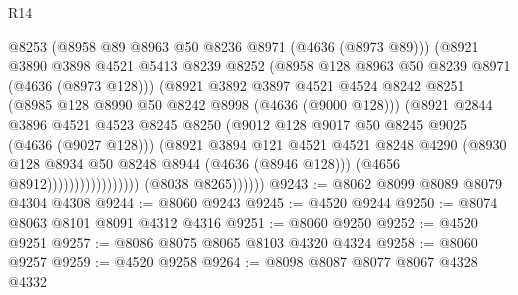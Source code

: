 \begin{lexlean}{R14}
\begin{coremodule}
                                      @8253
                                      (@8958 @89 @8963 @50 @8236 @8971 (@4636 (@8973 @89)))
                                      (@8921
                                        @3890
                                        @3898
                                        @4521
                                        @5413
                                        @8239
                                        @8252
                                        (@8958 @128 @8963 @50 @8239 @8971 (@4636 (@8973 @128)))
                                        (@8921
                                          @3892
                                          @3897
                                          @4521
                                          @4524
                                          @8242
                                          @8251
                                          (@8985 @128 @8990 @50 @8242 @8998 (@4636 (@9000 @128)))
                                          (@8921
                                            @2844
                                            @3896
                                            @4521
                                            @4523
                                            @8245
                                            @8250
                                            (@9012 @128 @9017 @50 @8245 @9025 (@4636 (@9027 @128)))
                                            (@8921
                                              @3894
                                              @121
                                              @4521
                                              @4521
                                              @8248
                                              @4290
                                              (@8930
                                                @128
                                                @8934
                                                @50
                                                @8248
                                                @8944
                                                (@4636 (@8946 @128)))
                                              (@4656 @8912)))))))))))))))))
              (@8038 @8265))))))
@9243 := @8062 @8099 @8089 @8079 @4304 @4308
@9244 := @8060 @9243
@9245 := @4520 @9244
@9250 := @8074 @8063 @8101 @8091 @4312 @4316
@9251 := @8060 @9250
@9252 := @4520 @9251
@9257 := @8086 @8075 @8065 @8103 @4320 @4324
@9258 := @8060 @9257
@9259 := @4520 @9258
@9264 := @8098 @8087 @8077 @8067 @4328 @4332

\end{coremodule}
\end{lexlean}
